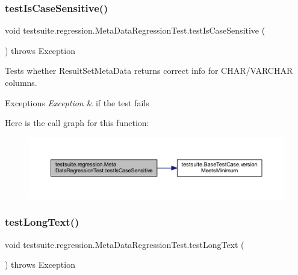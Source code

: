 \subsubsection{\texorpdfstring{test\+Is\+Case\+Sensitive()}{testIsCaseSensitive()}}
{\footnotesize\ttfamily void testsuite.\+regression.\+Meta\+Data\+Regression\+Test.\+test\+Is\+Case\+Sensitive (\begin{DoxyParamCaption}{ }\end{DoxyParamCaption}) throws Exception}

Tests whether Result\+Set\+Meta\+Data returns correct info for C\+H\+A\+R/\+V\+A\+R\+C\+H\+AR columns.


\begin{DoxyExceptions}{Exceptions}
{\em Exception} & if the test fails \\
\hline
\end{DoxyExceptions}
Here is the call graph for this function\+:
\nopagebreak
\begin{figure}[H]
\begin{center}
\leavevmode
\includegraphics[width=350pt]{classtestsuite_1_1regression_1_1_meta_data_regression_test_adb0e8b0fcde945a0ebdfbd318975979b_cgraph}
\end{center}
\end{figure}
\mbox{\label{classtestsuite_1_1regression_1_1_meta_data_regression_test_abc6512da546efa8175bd8245a997d554}} 
\subsubsection{\texorpdfstring{test\+Long\+Text()}{testLongText()}}
{\footnotesize\ttfamily void testsuite.\+regression.\+Meta\+Data\+Regression\+Test.\+test\+Long\+Text (\begin{DoxyParamCaption}{ }\end{DoxyParamCaption}) throws Exception}

